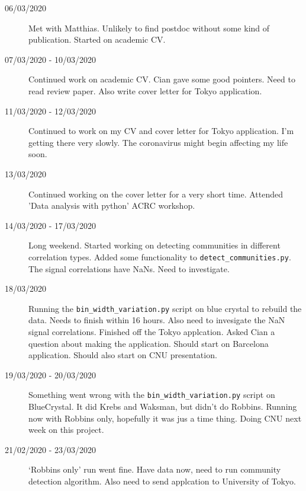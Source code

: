 \documentclass[a4paper,12pt]{article}
\theoremstyle{definition}
\begin{document}
\begin{description}
                                \item[06/03/2020] Met with Matthias. Unlikely to find postdoc without some kind of publication. Started on academic CV.
                                
                                \item[07/03/2020 - 10/03/2020] Continued work on academic CV. Cian gave some good pointers. Need to read review paper. Also write cover letter for Tokyo application.

                                \item[11/03/2020 - 12/03/2020] Continued to work on my CV and cover letter for Tokyo application. I'm getting there very slowly. The coronavirus might begin affecting my life soon.

                                \item[13/03/2020] Continued working on the cover letter for a very short time. Attended 'Data analysis with python' ACRC workshop.

                                \item[14/03/2020 - 17/03/2020] Long weekend. Started working on detecting communities in different correlation types. Added some functionality to \texttt{detect\_communities.py}. The signal correlations have NaNs. Need to investigate.

                                \item[18/03/2020] Running the \texttt{bin\_width\_variation.py} script on blue crystal to rebuild the data. Needs to finish within 16 hours. Also need to invesigate the NaN signal correlations. Finished off the Tokyo applcation. Asked Cian a question about making the application. Should start on Barcelona application. Should also start on CNU presentation.

                                \item[19/03/2020 - 20/03/2020] Something went wrong with the \texttt{bin\_width\_variation.py} script on BlueCrystal. It did Krebs and Waksman, but didn't do Robbins. Running now with Robbins only, hopefully it was jus a time thing. Doing CNU next week on this project.

                                \item[21/02/2020 - 23/03/2020] `Robbins only' run went fine. Have data now, need to run community detection algorithm. Also need to send applcation to University of Tokyo.
                                

\end{description}
\end{document}
